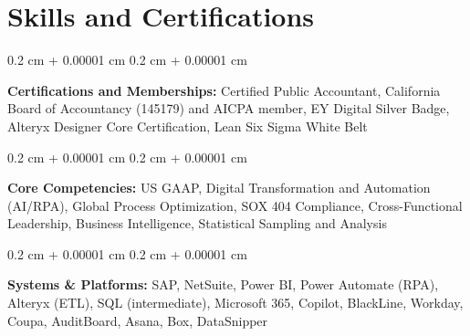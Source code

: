 \documentclass[10pt, letterpaper]{article}
\newenvironment{onecolentry}{
    \begin{adjustwidth}{
        0.2 cm + 0.00001 cm
    }{
        0.2 cm + 0.00001 cm
    }
}{
    \end{adjustwidth}
} %
\begin{document}
    
    \section{Skills and Certifications}

        \begin{onecolentry}
            \textbf{Certifications and Memberships:} Certified Public Accountant, California Board of Accountancy (145179) and AICPA member, EY Digital Silver Badge, Alteryx Designer Core Certification, Lean Six Sigma White Belt
        \end{onecolentry}




        \vspace{0.2 cm}

        \begin{onecolentry}
            \textbf{Core Competencies:} US GAAP, Digital Transformation and Automation (AI/RPA), Global Process Optimization, SOX 404 Compliance, Cross-Functional Leadership, Business Intelligence, Statistical Sampling and Analysis
        \end{onecolentry}

        \vspace{0.2 cm}

        \begin{onecolentry}
            \textbf{Systems \& Platforms:} SAP, NetSuite, Power BI, Power Automate (RPA), Alteryx (ETL), SQL (intermediate), Microsoft 365, Copilot, BlackLine, Workday, Coupa, AuditBoard, Asana, Box, DataSnipper
        \end{onecolentry}
\end{document}
